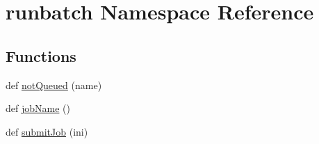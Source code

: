 \hypertarget{namespacerunbatch}{}\section{runbatch Namespace Reference}
\label{namespacerunbatch}
\subsection*{Functions}
\begin{DoxyCompactItemize}
\item 
def \mbox{\hyperlink{namespacerunbatch_a818669a56711afa7a624e689e4beb4af}{not\+Queued}} (name)
\item 
def \mbox{\hyperlink{namespacerunbatch_af5b0020e591d211b50a7a8254783847a}{job\+Name}} ()
\item 
def \mbox{\hyperlink{namespacerunbatch_a83ac3b0265b97b5bf1251f0041ada563}{submit\+Job}} (ini)
\end{DoxyCompactItemize}

